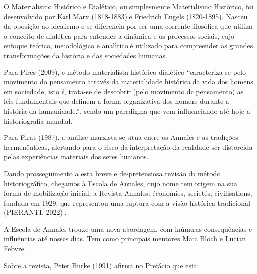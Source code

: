 \documentclass[
12pt,		%
openright,	%
twoside,  %
a4paper,			%
chapter=TITLE,		%
english,			%
french,				%
spanish,			%
brazil				%
]{USPSC-classe/USPSC}
\begin{document}
O Materialismo Hist\'orico e Dial\'etico, ou simplesmente Materialismo Hist\'orico, foi desenvolvido  por Karl Marx (1818-1883) e Friedrich Engels (1820-1895). Nasceu da oposi\c{c}\~ao ao idealismo e se diferencia por ser uma corrente filos\'ofica que utiliza o conceito de dial\'etica para entender a din\^amica e os processos sociais, cujo enfoque te\'orico, metodol\'ogico e anal\'{\i}tico \'e utilizado para compreender as grandes transforma\c{c}\~oes da hist\'oria e das sociedades humanas.








Para  Pires (2009), o m\'etodo materialista hist\'orico-dial\'etico “caracteriza-se pelo movimento do pensamento atrav\'es da materialidade hist\'orica da vida dos homens em sociedade, isto \'e, trata-se de descobrir (pelo movimento do pensamento) as leis fundamentais que definem a forma organizativa dos homens durante a hist\'oria da humanidade.”, sendo um paradigma que vem influenciando at\'e hoje a historiografia mundial.








Para Firat (1987), \textquotedbl a an\'alise marxista se situa entre os Annales e as tradi\c{c}\~oes hermen\^euticas\textquotedbl , alertando para o risco da interpreta\c{c}\~ao da realidade ser distorcida pelas \textquotedbl experi\^encias materiais dos seres humanos\textquotedbl .








Dando prosseguimento a esta breve e despretensiosa revis\~ao do m\'etodo historiogr\'afico, chegamos \`a Escola de Annales, cujo nome tem origem na sua forma de mobiliza\c{c}\~ao inicial, a Revista Annales: \'economies, societ\'es, civilisations, fundada em 1929, que representou uma ruptura com a vis\~ao hist\'orica tradicional (PIERANTI, 2022) .








A Escola de Annales trouxe uma nova abordagem, com in\'umeras consequ\^encias e influ\^encias at\'e nossos dias. Tem como principais mentores  Marc Bloch e Lucian Febvre.








Sobre a revista, Peter Burke (1991) afirma no Pref\'acio que esta:
\end{document}
